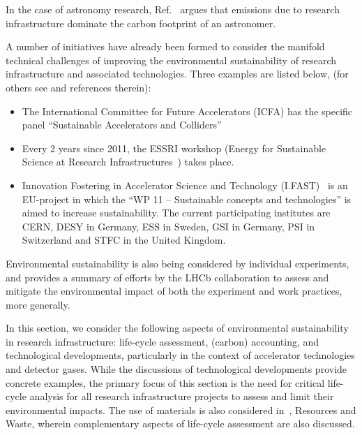 \documentclass[../SustainableHEP.tex]{subfiles}
\begin{document}
In the case of astronomy research, Ref.~\cite{Kn_dlseder_2022} argues that emissions due to research infrastructure dominate the carbon footprint of an astronomer.

A number of initiatives have already been formed to consider the manifold technical challenges of improving the environmental sustainability of research infrastructure and associated technologies. Three examples are listed below, (for others see  and references therein):
\begin{itemize}

    \item The International Committee for Future Accelerators (ICFA) has the specific panel “Sustainable Accelerators and Colliders”~\cite{SustainableAcceleratorsICFA}
    
    \item Every 2 years since 2011, the ESSRI workshop (Energy for Sustainable Science at Research Infrastructures~\cite{ESSRI5}) takes place.
    
    \item Innovation Fostering in Accelerator Science and Technology (I.FAST)~\cite{IFAST} is an EU-project in which the “WP 11 – Sustainable concepts and technologies” is aimed to increase sustainability. The current participating institutes are CERN, DESY in Germany, ESS in Sweden, GSI in Germany, PSI in Switzerland and STFC in the United Kingdom.

\end{itemize}
Environmental sustainability is also being considered by individual experiments, and  provides a summary of efforts by the LHCb collaboration to assess and mitigate the environmental impact of both the experiment and work practices, more generally.

In this section, we consider the following aspects of environmental sustainability in research infrastructure: life-cycle assessment, (carbon) accounting, and technological developments, particularly in the context of accelerator technologies and detector gases. While the discussions of technological developments provide concrete examples, the primary focus of this section is the need for critical life-cycle analysis for all research infrastructure projects to assess and limit their environmental impacts. The use of materials is also considered in~, Resources and Waste, wherein complementary aspects of life-cycle assessment are also discussed.
\end{document}
